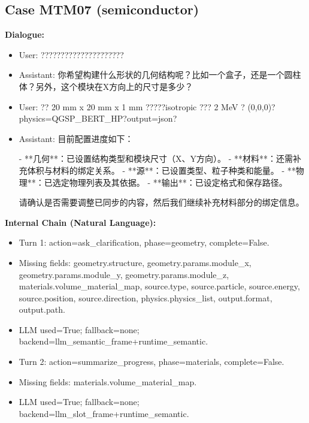 \documentclass[11pt]{ctexart}
\begin{document}
\subsection{Case MTM07 (semiconductor)}
\textbf{Dialogue:}
\begin{itemize}
\item User: ?????????????????????
\item Assistant: 你希望构建什么形状的几何结构呢？比如一个盒子，还是一个圆柱体？另外，这个模块在X方向上的尺寸是多少？
\item User: ?? 20 mm x 20 mm x 1 mm ?????isotropic ??? 2 MeV ? (0,0,0)?physics=QGSP\_BERT\_HP?output=json?
\item Assistant: 目前配置进度如下：

- **几何**：已设置结构类型和模块尺寸（X、Y方向）。
- **材料**：还需补充体积与材料的绑定关系。
- **源**：已设置类型、粒子种类和能量。
- **物理**：已选定物理列表及其依据。
- **输出**：已设定格式和保存路径。

请确认是否需要调整已同步的内容，然后我们继续补充材料部分的绑定信息。
\end{itemize}
\textbf{Internal Chain (Natural Language):}
\begin{itemize}
\item Turn 1: action=ask\_clarification, phase=geometry, complete=False.
\item Missing fields: geometry.structure, geometry.params.module\_x, geometry.params.module\_y, geometry.params.module\_z, materials.volume\_material\_map, source.type, source.particle, source.energy, source.position, source.direction, physics.physics\_list, output.format, output.path.
\item LLM used=True; fallback=none; backend=llm\_semantic\_frame+runtime\_semantic.
\item Turn 2: action=summarize\_progress, phase=materials, complete=False.
\item Missing fields: materials.volume\_material\_map.
\item LLM used=True; fallback=none; backend=llm\_slot\_frame+runtime\_semantic.
\end{itemize}
\end{document}
